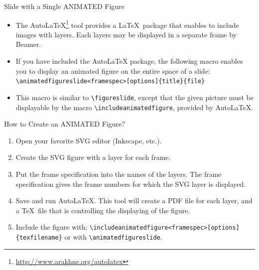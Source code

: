 \documentclass[english,sectioncirclenumberstyle]{ciadbeamer}
\begin{document}

\begin{frame}{Slide with a Single ANIMATED Figure}
	\begin{itemize}
	\item The AutoLaTeX\footnote{\url{http://www.arakhne.org/autolatex}} tool provides a \LaTeX\ package that enables to include images with layers. Each layers may be displayed in a separate frame by Beamer.
	\vfill
	\item If you have included the AutoLaTeX package, the following macro enables you to display an animated figure on the entire space of a slide: \\
		\texttt{{\textbackslash}animatedfigureslide<framespec>[options]\{title\}\{file\}}
	\item This macro is similar to \texttt{{\textbackslash}figureslide}, except that the given picture must be displayable by the macro \texttt{{\textbackslash}includeanimatedfigure}, provided by AutoLaTeX.
	\end{itemize}
\end{frame}

\begin{frame}{How to Create an ANIMATED Figure?}
	\smaller
	\begin{enumerate}
	\item Open your favorite SVG editor (Inkscape, etc.).
	\item Create the SVG figure with a layer for each frame.
	\item Put the frame specification into the names of the layers. The frame specification gives the frame numbers for which the SVG layer is displayed. 
	\item Save and run AutoLaTeX. This tool will create a PDF file for each layer, and a \TeX\ file that is controlling the displaying of the figure.
	\item Include the figure with: \texttt{{\textbackslash}includeanimatedfigure<framespec>[options]\{texfilename\}} or with \texttt{{\textbackslash}animatedfigureslide}.
	\end{enumerate}
\end{frame}
\end{document}
